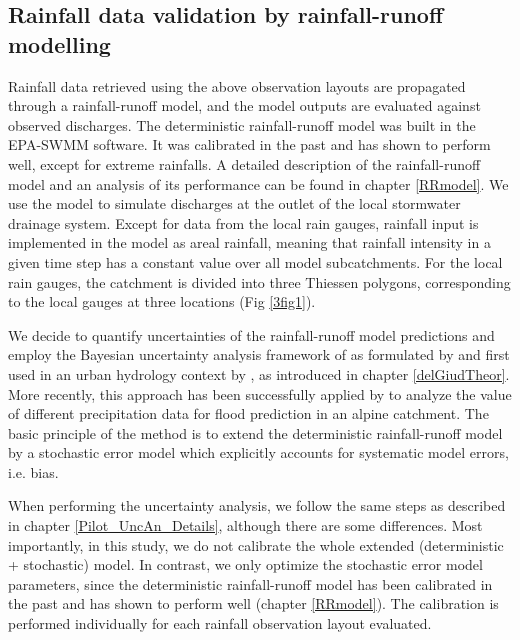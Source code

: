 \documentclass{ctuthesis}\usepackage[]{graphicx}\usepackage[]{color}
\begin{document}
\subsection{Rainfall data validation by rainfall-runoff modelling} \label{pIII_val}

Rainfall data retrieved using the above observation layouts are propagated through a rainfall-runoff model, and the model outputs are evaluated against observed discharges. The deterministic rainfall-runoff model was built in the EPA-SWMM software. It was calibrated in the past and has shown to perform well, except for extreme rainfalls. A detailed description of the rainfall-runoff model and an analysis of its performance can be found in chapter \ref{RRmodel}. We use the model to simulate discharges at the outlet of the local stormwater drainage system. Except for data from the local rain gauges, rainfall input is implemented in the model as areal rainfall, meaning that rainfall intensity in a given time step has a constant value over all model subcatchments. For the local rain gauges, the catchment is divided into three Thiessen polygons, corresponding to the local gauges at three locations (Fig \ref{3fig1}).

We decide to quantify uncertainties of the rainfall-runoff model predictions and employ the Bayesian uncertainty analysis framework of  \cite{kennedy2001bayesian} as formulated by \cite{reichert2012linking} and first used in an urban hydrology context by \cite{giudice2013improving}, as introduced in chapter \ref{delGiudTheor}. More recently, this approach has been successfully applied by \cite{sikorskaValueDifferentPrecipitation2018} to analyze the value of different precipitation data for flood prediction in an alpine catchment. The basic principle of the method is to extend the deterministic rainfall-runoff model by a stochastic error model which explicitly accounts for systematic model errors, i.e. bias. 

When performing the uncertainty analysis, we follow the same steps as described in chapter \ref{Pilot_UncAn_Details}, although there are some differences. Most importantly, in this study, we do not calibrate the whole extended (deterministic + stochastic) model. In contrast, we only optimize the stochastic error model parameters, since the deterministic rainfall-runoff model has been calibrated in the past and has shown to perform well (chapter \ref{RRmodel}). The calibration is performed individually for each rainfall observation layout evaluated.
\end{document}
